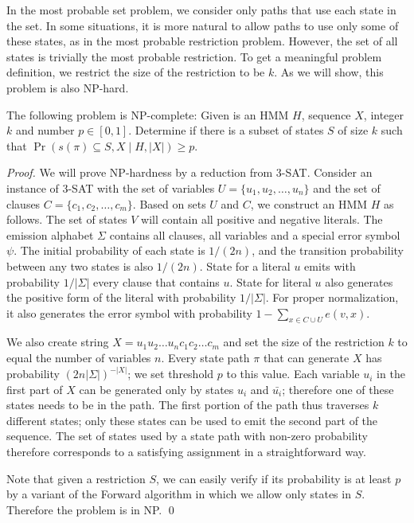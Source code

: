 \begin{reformulate*}
\label{sec:restriction}

In the most probable set problem, we consider only paths that use each
state in the set. In some situations, it is more natural to allow
paths to use only some of these states, as in the most probable
restriction problem. However, the set of all states is
trivially the most probable restriction. To get a meaningful problem
definition, we restrict the size of the restriction to be $k$. As we
will show, this problem is also NP-hard.

\begin{theorem}
The following problem is NP-complete: Given is an HMM $H$, sequence
$X$, integer $k$ and number $p\in [0,1]$. Determine if
there is a subset of states $S$ of size $k$ such that 
$\Pr(s(\pi)\subseteq S, X\mid H,|X|)\ge p$. 
\end{theorem}

\begin{proof}
We will prove NP-hardness by a reduction from 3-SAT. Consider an
instance of 3-SAT with the set of variables $U=\{u_1,u_2,\dots,u_n\}$
and the set of clauses $C=\{c_1,c_2,\dots,c_m\}$. 
Based on sets $U$ and $C$, we construct an HMM $H$ as
follows.  The set of states $V$ will contain all positive and negative
literals. The emission alphabet $\Sigma$ contains all clauses, all
variables and a special error symbol $\psi$. The initial probability
of each state is $1/(2n)$, and the transition probability
between any two states is also $1/(2n)$. State for a literal
$u$ emits with probability $1/|\Sigma|$ every clause that contains $u$.
State for literal $u$ also generates the positive form of the literal
with probability $1/|\Sigma|$. For proper normalization, 
it also generates the error symbol 
with probability $1-\sum_{x\in C\cup U}e(v,x)$. 

We also create string $X=u_1u_2\dots
u_nc_1c_2\dots c_m$ and set the size of the restriction $k$ to equal
the number of variables $n$. Every state path $\pi$ that can generate
$X$ has probability $(2n|\Sigma|)^{-|X|}$; we set threshold $p$ to
this value. Each 
variable $u_i$ in the first part of $X$ 
can be generated only by states $u_i$ and
$\bar{u_i}$; therefore one of these states needs to be in the
path. The first portion of the path thus traverses $k$ 
different states; only these states can be used to emit the second part of the
sequence. 
The set of states used by a state path with
non-zero probability therefore corresponds to a satisfying assignment
in a straightforward way. 

Note that given a restriction $S$, we can easily verify if its
probability is at least $p$ by a variant of the Forward algorithm
in which we allow only states in $S$. Therefore the problem is in NP.
\qed
\end{proof}
\end{reformulate*}

